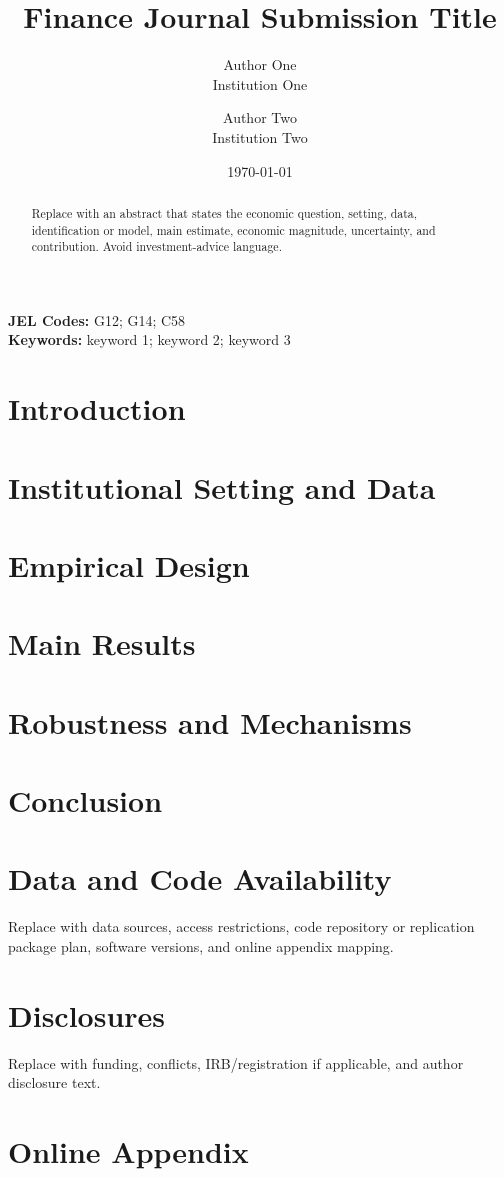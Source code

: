 \documentclass[11pt]{article}
\title{Finance Journal Submission Title}
\author{Author One\\Institution One \and Author Two\\Institution Two}
\date{\today}
\begin{document}
\maketitle

\begin{abstract}
Replace with an abstract that states the economic question, setting, data, identification or model,
main estimate, economic magnitude, uncertainty, and contribution. Avoid investment-advice language.
\end{abstract}

\noindent\textbf{JEL Codes:} G12; G14; C58\\
\textbf{Keywords:} keyword 1; keyword 2; keyword 3

\section{Introduction}

\section{Institutional Setting and Data}

\section{Empirical Design}

\section{Main Results}

\section{Robustness and Mechanisms}

\section{Conclusion}

\section*{Data and Code Availability}
Replace with data sources, access restrictions, code repository or replication package plan, software
versions, and online appendix mapping.

\section*{Disclosures}
Replace with funding, conflicts, IRB/registration if applicable, and author disclosure text.




\clearpage
\appendix
\section{Online Appendix}
\end{document}
